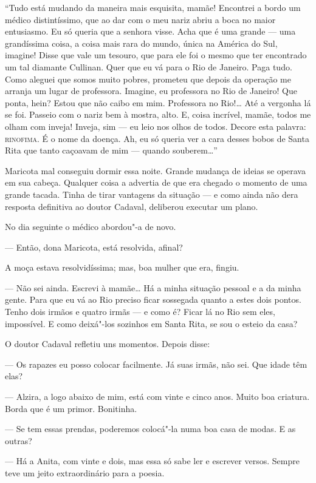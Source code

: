 ``Tudo está mudando da maneira mais esquisita, mamãe! Encontrei a bordo
um médico distintíssimo, que ao dar com o meu nariz abriu a boca no
maior entusiasmo. Eu só queria que a senhora visse. Acha que é uma
grande --- uma grandíssima coisa, a coisa mais rara do mundo, única na
América do Sul, imagine! Disse que vale um tesouro, que para ele foi o
mesmo que ter encontrado um tal diamante Cullinan. Quer que eu vá para o
Rio de Janeiro. Paga tudo. Como aleguei que somos muito pobres, prometeu
que depois da operação me arranja um lugar de professora. Imagine, eu
professora no Rio de Janeiro! Que ponta, hein? Estou que não caibo em
mim. Professora no Rio!\ldots{} Até a vergonha lá se foi. Passeio com o nariz
bem à mostra, alto. E, coisa incrível, mamãe, todos me olham com inveja!
Inveja, sim --- eu leio nos olhos de todos. Decore esta palavra:
\textsc{rinofima}. É o nome da doença. Ah, eu só queria ver a cara desses bobos
de Santa Rita que tanto caçoavam de mim --- quando souberem\ldots{}''

Maricota mal conseguiu dormir essa noite. Grande mudança de ideias se
operava em sua cabeça. Qualquer coisa a advertia de que era chegado o
momento de uma grande tacada. Tinha de tirar vantagens da situação --- e
como ainda não dera resposta definitiva ao doutor Cadaval, deliberou
executar um plano.

No dia seguinte o médico abordou"-a de novo.

--- Então, dona Maricota, está resolvida, afinal?

A moça estava resolvidíssima; mas, boa mulher que era, fingiu.

--- Não sei ainda. Escrevi à mamãe\ldots{} Há a minha situação pessoal e a da
minha gente. Para que eu vá ao Rio preciso ficar sossegada quanto a
estes dois pontos. Tenho dois irmãos e quatro irmãs --- e como é? Ficar
lá no Rio sem eles, impossível. E como deixá"-los sozinhos em Santa Rita,
se sou o esteio da casa?

O doutor Cadaval refletiu uns momentos. Depois disse:

--- Os rapazes eu posso colocar facilmente. Já suas irmãs, não sei. Que
idade têm elas?

--- Alzira, a logo abaixo de mim, está com vinte e cinco anos. Muito boa
criatura. Borda que é um primor. Bonitinha.

--- Se tem essas prendas, poderemos colocá"-la numa boa casa de modas. E
as outras?

--- Há a Anita, com vinte e dois, mas essa só sabe ler e escrever
versos. Sempre teve um jeito extraordinário para a poesia.

